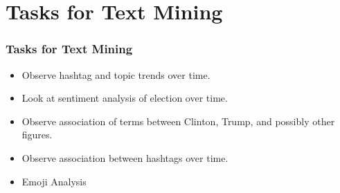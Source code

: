 \documentclass{beamer}
\begin{document}
\section{Tasks for Text Mining}

\begin{frame}
	\frametitle{Tasks for Text Mining}
	\begin{itemize}
    \item Observe hashtag and topic trends over time.
    \newline
    \item Look at sentiment analysis of election over time.
    \newline
    \item Observe association of terms between Clinton, Trump, and possibly
      other figures.
    \newline
    \item Observe association between hashtags over time.
    \newline
    \item Emoji Analysis
    \newline
	\end{itemize}
\end{frame}

\end{document}
